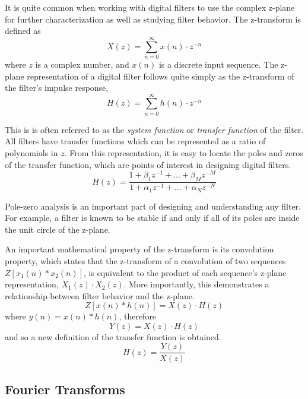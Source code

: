 \documentclass[reprint,amsmath,amssymb]{revtex4-2}
\begin{document}
It is quite common when working with digital filters to use the complex z-plane for further characterization as well as studying filter behavior. The z-transform is defined as
\begin{equation}
    X(z) = \sum_{n=0}^\infty x(n)\cdot z^{-n}
\end{equation}
where $z$ is a complex number, and $x(n)$ is a discrete input sequence. The z-plane representation of a digital filter follows quite simply as the z-transform of the filter's impulse response,
\begin{equation}
    H(z) = \sum_{n=0}^\infty h(n)\cdot z^{-n}
\end{equation}

This is is often referred to as the \textit{system function} or \textit{transfer function} of the filter. All filters have transfer functions which can be represented as a ratio of polynomials in $z$. From this representation, it is easy to locate the poles and zeros of the transfer function, which are points of interest in designing digital filters.
\begin{equation}
    H(z) = \frac{1+\beta_1z^{-1} + \ldots + \beta_Mz^{-M}}{1+\alpha_1z^{-1} + \ldots + \alpha_Nz^{-N}}
\end{equation}

Pole-zero analysis is an important part of designing and understanding any filter. For example, a filter is known to be stable if and only if all of its poles are inside the unit circle of the z-plane.

An important mathematical property of the z-transform is its convolution property, which states that the z-transform of a convolution of two sequences $Z[x_1(n)*x_2(n)]$, is equivalent to the product of each sequence's z-plane representation, $X_1(z)\cdot X_2(z)$. More importantly, this demonstrates a relationship between filter behavior and the z-plane.
\begin{equation}
    Z[x(n)*h(n)] = X(z)\cdot H(z) \nonumber
\end{equation}
where $y(n) = x(n) * h(n)$, therefore
\begin{equation}
    Y(z) = X(z) \cdot H(z) 
\end{equation}
and so a new definition of the transfer function is obtained.
\begin{equation}
    H(z) = \frac{Y(z)}{X(z)}
\end{equation}

\subsection{Fourier Transforms}
\end{document}
